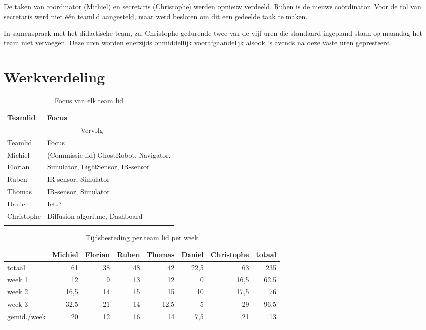 \documentclass[12pt,a4paper]{report}
\begin{document}
De taken van co\"ordinator (Michiel) en secretaris (Christophe) werden opnieuw verdeeld. Ruben is de nieuwe co\"ordinator. Voor de rol van secretaris werd niet \'e\'en teamlid aangesteld, maar werd besloten om dit een gedeelde taak te maken.

In samenspraak met het didactische team, zal Christophe gedurende twee van de vijf uren die standaard ingepland staan op maandag het team niet vervoegen. Deze uren worden enerzijds onmiddellijk voorafgaandelijk alsook 's avonds na deze vaste uren gepresteerd.

\chapter{Werkverdeling}

\begin{longtable}{l l}
\caption{Focus van elk team lid} \\ [0.5ex]
\hline\hline
Teamlid & Focus \\ [0.5ex]
\hline 
\endfirsthead
\multicolumn{2}{c}{{\tablename} \thetable{} -- Vervolg} \\[0.5ex]
\hline \hline
Teamlid & Focus \\ [0.5ex]
\hline 
\endhead
Michiel 		& 	(Commissie-lid) GhostRobot, Navigator. \\
Florian 		&	Simulator, LightSensor, IR-sensor\\
Ruben 		&	IR-sensor, Simulator\\
Thomas 		&	IR-sensor, Simulator\\
Daniel 		&	Iets? \\
Christophe 	&	Diffusion algoritme, Dashboard \\
\hline
\label{tab:focus}
\end{longtable}

\begin{longtable}{l r r r r r r r}
\caption{Tijdsbesteding per team lid per week} \\
\hline\hline
 & Michiel & Florian & Ruben & Thomas & Daniel & Christophe & totaal \\
\hline 
\endfirsthead
totaal & 61 & 38 & 48 & 42 & 22,5 & 63 & 235\\
\hline
week 1 & 12 & 9 & 13 & 12 & 0 & 16,5 & 62,5 \\
week 2 & 16,5 & 14 & 15 & 15 & 10 & 17,5 & 76 \\
week 3 & 32,5 & 21 & 14 & 12,5 & 5 & 29 & 96,5 \\
\hline
gemid./week & 20 & 12 & 16 & 14 & 7,5 & 21 & 13 \\
\label{tab:tijdsregistratie}
\end{longtable}
\end{document}
